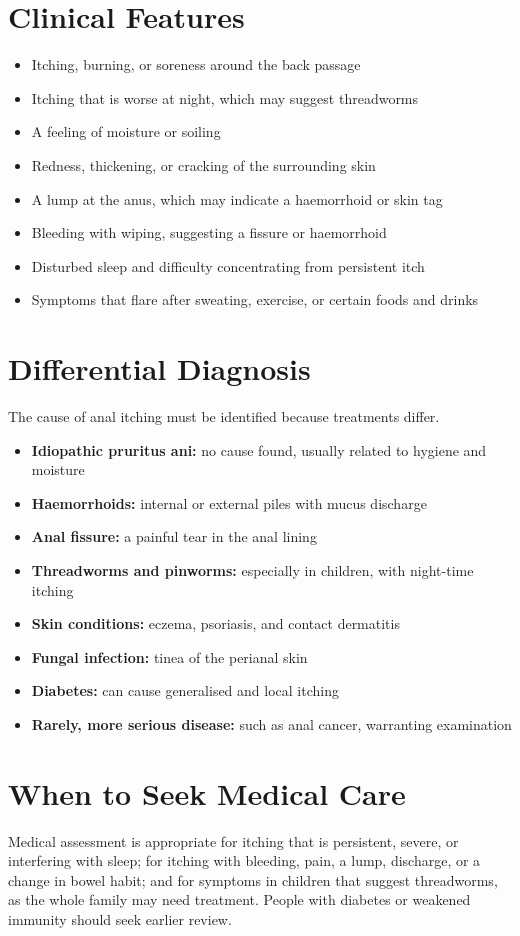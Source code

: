 \section*{Clinical Features}
\begin{itemize}
    \item Itching, burning, or soreness around the back passage
    \item Itching that is worse at night, which may suggest threadworms
    \item A feeling of moisture or soiling
    \item Redness, thickening, or cracking of the surrounding skin
    \item A lump at the anus, which may indicate a haemorrhoid or skin tag
    \item Bleeding with wiping, suggesting a fissure or haemorrhoid
    \item Disturbed sleep and difficulty concentrating from persistent itch
    \item Symptoms that flare after sweating, exercise, or certain foods and drinks
\end{itemize}

\section*{Differential Diagnosis}
The cause of anal itching must be identified because treatments differ.
\begin{itemize}
    \item \textbf{Idiopathic pruritus ani:} no cause found, usually related to hygiene and moisture
    \item \textbf{Haemorrhoids:} internal or external piles with mucus discharge
    \item \textbf{Anal fissure:} a painful tear in the anal lining
    \item \textbf{Threadworms and pinworms:} especially in children, with night-time itching
    \item \textbf{Skin conditions:} eczema, psoriasis, and contact dermatitis
    \item \textbf{Fungal infection:} tinea of the perianal skin
    \item \textbf{Diabetes:} can cause generalised and local itching
    \item \textbf{Rarely, more serious disease:} such as anal cancer, warranting examination
\end{itemize}

\section*{When to Seek Medical Care}
Medical assessment is appropriate for itching that is persistent, severe, or interfering with sleep; for itching with bleeding, pain, a lump, discharge, or a change in bowel habit; and for symptoms in children that suggest threadworms, as the whole family may need treatment. People with diabetes or weakened immunity should seek earlier review.

